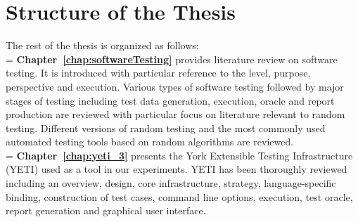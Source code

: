 %
\bigskip
\section{Structure of the Thesis}

The rest of the thesis is organized as follows:\\

\hangindent=\parindent
{}
\noindent
\textbf{Chapter~\ref{chap:softwareTesting}} provides literature review on software testing. It is introduced with particular reference to the level, purpose, perspective and execution. Various types of software testing followed by major stages of testing including test data generation, execution, oracle and report production are reviewed with particular focus on literature relevant to random testing. Different versions of random testing and the most commonly used automated testing tools based on random algorithms are reviewed. \\


\hangindent=\parindent
{}
\noindent
\textbf{Chapter~\ref{chap:yeti_3}} presents the York Extensible Testing Infrastructure (YETI) used as a tool in our experiments. YETI has been thoroughly reviewed including an overview, design, core infrastructure, strategy, language-specific binding, construction of test cases, command line options, execution, test oracle, report generation and graphical user interface.\\

